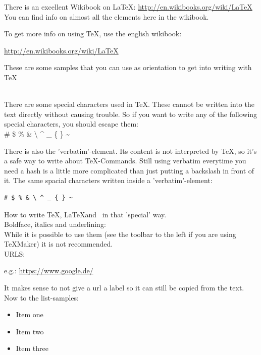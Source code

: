\documentclass[a4paper, 12pt,oneside]{article}
\begin{document}
There is an excellent Wikibook on \LaTeX: \url{http://en.wikibooks.org/wiki/LaTeX}\\
You can find info on almost all the elements here in the wikibook. 

To get more info on using \TeX, use the english wikibook:  \begin{flushright}
\url{http://en.wikibooks.org/wiki/LaTeX}
\end{flushright}

\begin{LARGE}
These are some samples that you can use as orientation to get into writing with \TeX
\end{LARGE}\\


There are some special characters used in \TeX. These cannot be written into the text directly without causing trouble. So if you want to write any of the following special characters, you should escape them:\\

\#
\$
\%
\&
\textbackslash{}
\textasciicircum{}
\_
\{
\}
\textasciitilde{}


There is also the 'verbatim'-element. Its content is not interpreted by \TeX, so it's a safe way to write about \TeX-Commands. Still using verbatim everytime you need a hash is a little more complicated than just putting a backslash in front of it. 
The same spacial characters written inside a 'verbatim'-element:
\begin{verbatim}
# $ % & \ ^ _ { } ~
\end{verbatim}

How to write \TeX, \LaTeX and \BibTeX\ in that 'special' way. \\

Boldface, italics and underlining:\\

While it is possible to use them (see the toolbar to the left if you are using TeXMaker) it is not recommended. \\


URLS:

e.g.:
\url{https://www.google.de/}

It makes sense to not give a url a label so it can still be copied from the text. \\


Now to the list-samples:
\begin{itemize}
\item Item one
\item Item two
\item Item three
\end{itemize}
\end{document}
